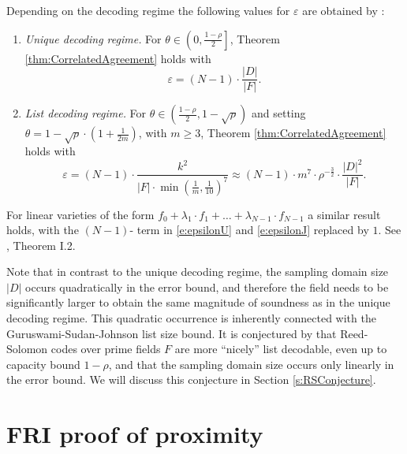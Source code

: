 \documentclass[11pt,article,oneside]{memoir}
\theoremstyle{definition}
\theoremstyle{remark}
\begin{document}
Depending on the decoding regime the following values for $\varepsilon$ are obtained by \cite{ProximityGaps}:
\begin{enumerate}
\item
\textit{Unique decoding regime.} 
For $\theta\in \left(0,\frac{1-\rho}{2}\right]$, Theorem \ref{thm:CorrelatedAgreement} holds with
\begin{equation}
\label{e:epsilonU}
\varepsilon = (N-1)\cdot \frac{|D|}{|F|}.
\end{equation}
\item
\textit{List decoding regime.} 
For $\theta\in \left(\frac{1-\rho}{2},1-\sqrt\rho\right)$ and setting $\theta =1-\sqrt\rho \cdot\left(1 +\frac{1}{2m}\right)$, with $m\geq 3$, Theorem \ref{thm:CorrelatedAgreement} holds with
\begin{equation}
\label{e:epsilonJ}
\varepsilon =  (N-1)\cdot \frac{k^2}{|F|\cdot \min\left(\frac{1}{m}, \frac{1}{10}\right)^7}
\approx (N-1)\cdot m^7\cdot \rho^{-\frac{3}{2}} \cdot \frac{|D|^2}{|F|}.
\end{equation}
\end{enumerate}

For linear varieties of the form $f_0 + \lambda_1\cdot f_1+  \ldots + \lambda_{N-1}\cdot f_{N-1}$ a similar result holds, with the $(N-1)$- term in \eqref{e:epsilonU} and \eqref{e:epsilonJ} replaced by $1$. 
See \cite{ProximityGaps}, Theorem I.2. %

Note that in contrast to the unique decoding regime, the sampling domain size $|D|$ occurs quadratically in the error bound, and therefore the field needs to be significantly larger to obtain the same magnitude of soundness as in the unique decoding regime.  
This quadratic occurrence is inherently connected with the Guruswami-Sudan-Johnson list size bound. 
It is conjectured by \cite{DEEPFRI} that Reed-Solomon codes over prime fields $F$ are more “nicely” list decodable, even up to capacity bound $1-\rho$, and that the sampling domain size occurs only linearly in the error bound. 
We will discuss this conjecture in Section \ref{s:RSConjecture}. 




\chapter{FRI proof of proximity}
\end{document}
